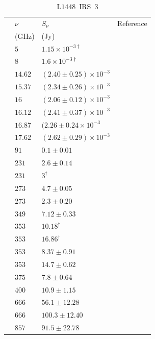 \documentclass[9pt]{extarticle}   	%
\begin{document}
\begin{table}
\caption{L$1448$~IRS~$3$}
\begin{center}
\begin{tabular}{llll}
\hline
 & $\nu$ & $S_\nu$ & Reference\\
 & (GHz) & (Jy) & \\
\hline
 & $5$ & $1.15\times10^{-3\dag}$ & \citet{1990ApJ...365L..85C}\\
 & $8$ & $1.6\times10^{-3\dag}$ & \citet{2002AJ....124.1045R}\\
 & $14.62$ & $(2.40\pm0.25)\times10^{-3}$ & \citet{2012MNRAS.423.1089A}\\
 & $15.37$ & $(2.34\pm0.26)\times10^{-3}$ & \citet{2012MNRAS.423.1089A}\\
 & $16$ & $(2.06\pm0.12)\times10^{-3}$ & \citet{2011MNRAS.415..893A}\\
 & $16.12$ & $(2.41\pm0.37)\times10^{-3}$ & \citet{2012MNRAS.423.1089A}\\
 & $16.87$ & $(2.26\pm0.24\times10^{-3}$ & \citet{2012MNRAS.423.1089A}\\
 & $17.62$ & $(2.62\pm0.29)\times10^{-3}$ & \citet{2012MNRAS.423.1089A}\\
 & $91$ & $0.1\pm0.01$ & \citet{2011AJ....141...39S}\\
 & $231$ & $2.6\pm0.14$ & \citet{1998ApJ...509..733B}\\
 & $231$ & $3^{\dag}$ & \citet{2001AA...365..440M}\\
 & $273$ & $4.7\pm0.05$ & \citet{2006ApJ...638..293E}\\
 & $273$ & $2.3\pm0.20$ & \citet{1998ApJ...509..733B}\\
 & $349$ & $7.12\pm0.33$ & \citet{2011AJ....141...39S}\\
 & $353$ & $10.18^{\dag}$ & \citet{2008ApJS..175..277D}\\
 & $353$ & $16.86^{\dag}$ & \citet{2007AA...468.1009H}\\
 & $353$ & $8.37\pm0.91$ & \citet{2000ApJ...530..851C}\\
 & $353$ & $14.7\pm0.62$ & \citet{2000ApJS..131..249S}\\
 & $375$ & $7.8\pm0.64$ & \citet{1998ApJ...509..733B}\\
 & $400$ & $10.9\pm1.15$ & \citet{2000ApJ...530..851C}\\
 & $666$ & $56.1\pm12.28$ & \citet{2000ApJ...530..851C}\\
 & $666$ & $100.3\pm12.40$ & \citet{2000ApJS..131..249S}\\
 & $857$ & $91.5\pm22.78$ & \citet{2000ApJ...530..851C}\\

\end{tabular}
\end{center}
\end{table}
\end{document}

